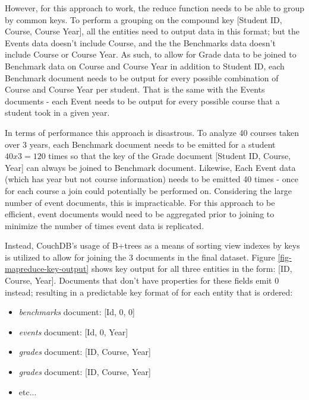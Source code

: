 However, for this approach to work, the reduce function needs to be able to group by common keys. To perform a grouping on the compound key [Student ID, Course, Course Year], all the entities need to output data in this format; but the Events data doesn't include Course, and the the Benchmarks data doesn't include Course or Course Year. As such, to allow for Grade data to be joined to Benchmark data on Course and Course Year in addition to Student ID, each Benchmark document needs to be output for every possible combination of Course and Course Year per student. That is the same with the Events documents - each Event needs to be output for every possible course that a student took in a given year.

In terms of performance this approach is disastrous. To analyze 40 courses taken over 3 years, each Benchmark document needs to be emitted for a student $40 x 3 = 120$ times so that the key of the Grade document [Student ID, Course, Year] can always be joined to Benchmark document. Likewise, Each Event data (which has year but not course information) needs to be emitted 40 times - once for each course a join could potentially be performed on. Considering the large number of event documents, this is impracticable. For this approach to be efficient, event documents would need to be aggregated prior to joining to minimize the number of times event data is replicated.

Instead, CouchDB's usage of B+trees as a means of sorting view indexes by keys is utilized to allow for joining the 3 documents in the final dataset. Figure \ref{fig-mapreduce-key-output} shows key output for all three entities in the form: [ID, Course, Year]. Documents that don't have properties for these fields emit 0 instead; resulting in a predictable key format of for each entity that is ordered:

\begin{itemize}
    \item \textit{benchmarks} document: [Id, 0, 0]
    \item \textit{events} document: [Id, 0, Year]
    \item \textit{grades} document: [ID, Course, Year]
    \item \textit{grades} document: [ID, Course, Year]
    \item etc...
\end{itemize}

